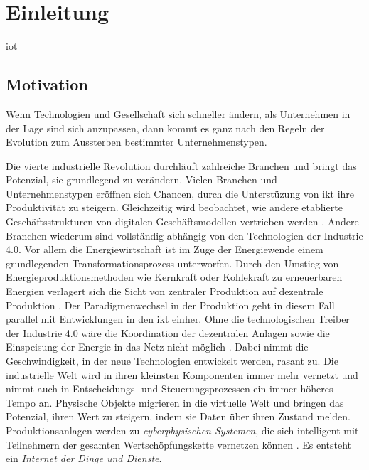 \section{Einleitung}

\ac{iot}

\subsection{Motivation}

\begin{displayquote}
  \glqq Wenn Technologien und Gesellschaft sich schneller ändern, als Unternehmen in der Lage sind sich anzupassen, dann kommt es ganz nach den Regeln der Evolution zum Aussterben bestimmter Unternehmenstypen.\grqq{}
\end{displayquote}

\begin{flushright}
  \citet[S. 3, zitiert nach Land, K.-H. 2015]{Roth2016}
\end{flushright}

\noindent Die vierte industrielle Revolution durchläuft zahlreiche Branchen und bringt das Potenzial, sie grundlegend zu verändern. Vielen Branchen und Unternehmenstypen eröffnen sich Chancen, durch die Unterstüzung von \ac{ikt} ihre Produktivität zu steigern. Gleichzeitig wird beobachtet, wie andere etablierte Geschäftsstrukturen von digitalen Geschäftsmodellen vertrieben werden \citep{Lauenroth2016}. Andere Branchen wiederum sind vollständig abhängig von den Technologien der Industrie 4.0. Vor allem die Energiewirtschaft ist im Zuge der Energiewende einem grundlegenden Transformationsprozess unterworfen. Durch den Umstieg von Energieproduktionsmethoden wie Kernkraft oder Kohlekraft zu erneuerbaren Energien verlagert sich die Sicht von zentraler Produktion auf dezentrale Produktion \citep{Doleski2015}. Der Paradigmenwechsel in der Produktion geht in diesem Fall parallel mit Entwicklungen in den \ac{ikt} einher. Ohne die technologischen Treiber der Industrie 4.0 wäre die Koordination der dezentralen Anlagen sowie die Einspeisung der Energie in das Netz nicht möglich \citep{Utecht2018}. Dabei nimmt die Geschwindigkeit, in der neue Technologien entwickelt werden, rasant zu. Die industrielle Welt wird in ihren kleinsten Komponenten immer mehr vernetzt und nimmt auch in Entscheidungs- und Steuerungsprozessen ein immer höheres Tempo an. Physische Objekte migrieren in die virtuelle Welt und bringen das Potenzial, ihren Wert zu steigern, indem sie Daten über ihren Zustand melden. Produktionsanlagen werden zu \textit{cyberphysischen Systemen}, die sich intelligent mit Teilnehmern der gesamten Wertschöpfungskette vernetzen können \citep{Lauenroth2016}. Es entsteht ein \textit{Internet der Dinge und Dienste}. 

